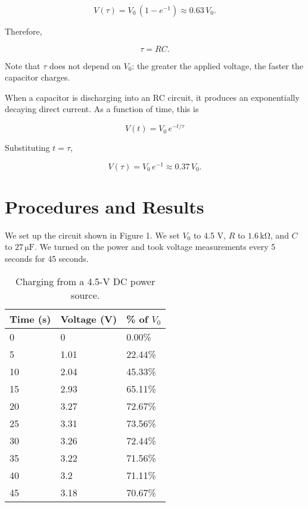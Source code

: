 \documentclass[11pt, titlepage, letterpaper, twoside]{article}
\begin{document}
\begin{equation}
  V(\tau) = V_0\,(1 - e^{-1}) \approx 0.63\,V_0.
\end{equation}

\pagebreak

Therefore,

\begin{equation}
  \tau = RC.
\end{equation}

Note that $\tau$ does not depend on $V_0$: the greater the applied voltage, the faster the capacitor charges.

When a capacitor is discharging into an RC circuit, it produces an exponentially decaying direct current. As a function of time,
this is

\begin{equation}
  V(t) = V_0\, e^{-t/\tau}
\end{equation}

Substituting $t = \tau$,

\begin{equation}
  V(\tau) = V_0\, e^{-1} \approx 0.37\,V_0.
\end{equation}


\section{Procedures and Results}
We set up the circuit shown in Figure 1. We set $V_0$ to 4.5 V, $R$ to $1.6\,\mathrm{k\Omega}$, and $C$ to $27\,\mathrm{\mu F}$. We turned on
the power and took voltage measurements every 5 seconds for 45 seconds.

\begin{table}[h!]
\centering
\caption{Charging from a 4.5-V DC power source.}
\label{charging-1}
\begin{tabular}{|l|l|l|}
\hline
Time (s) & Voltage (V) & \% of $V_0$ \\ \hline
0        & 0           & 0.00\%     \\ \hline
5        & 1.01        & 22.44\%    \\ \hline
10       & 2.04        & 45.33\%    \\ \hline
15       & 2.93        & 65.11\%    \\ \hline
20       & 3.27        & 72.67\%    \\ \hline
25       & 3.31        & 73.56\%    \\ \hline
30       & 3.26        & 72.44\%    \\ \hline
35       & 3.22        & 71.56\%    \\ \hline
40       & 3.2         & 71.11\%    \\ \hline
45       & 3.18        & 70.67\%    \\ \hline
\end{tabular}
\end{table}
\end{document}
